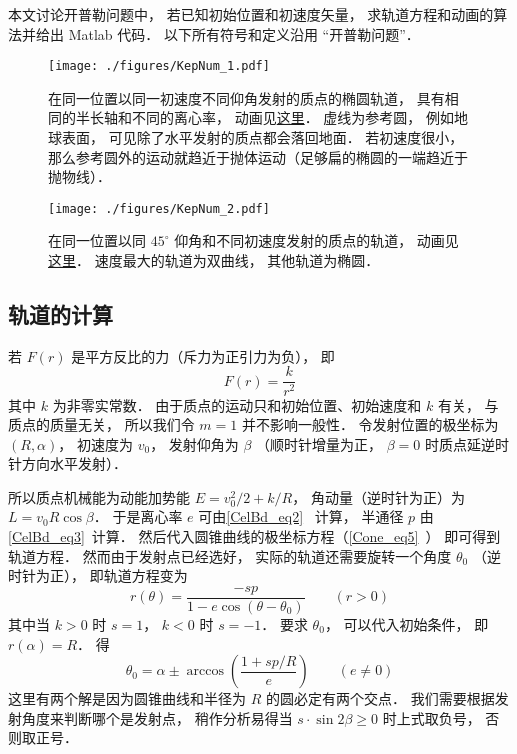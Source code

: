 
\begin{issues}
\end{issues}


本文讨论开普勒问题中， 若已知初始位置和初速度矢量， 求轨道方程和动画的算法并给出 Matlab 代码． 以下所有符号和定义沿用 “开普勒问题”．
\begin{figure}[ht]
\centering
\texttt{[image: ./figures/KepNum\_1.pdf]}
\caption{在同一位置以同一初速度不同仰角发射的质点的椭圆轨道， 具有相同的半长轴和不同的离心率， 动画见\href{https://wuli.wiki/apps/Kepler.html}{这里}． 虚线为参考圆， 例如地球表面， 可见除了水平发射的质点都会落回地面． 若初速度很小， 那么参考圆外的运动就趋近于抛体运动（足够扁的椭圆的一端趋近于抛物线）．} \label{KepNum_fig1}
\end{figure}

\begin{figure}[ht]
\centering
\texttt{[image: ./figures/KepNum\_2.pdf]}
\caption{在同一位置以同 $45^\circ$ 仰角和不同初速度发射的质点的轨道， 动画见\href{https://wuli.wiki/apps/Kepler2.html}{这里}． 速度最大的轨道为双曲线， 其他轨道为椭圆．} \label{KepNum_fig2}
\end{figure}

\subsection{轨道的计算}
若 $F(r)$ 是平方反比的力（斥力为正引力为负）， 即
\begin{equation}
F(r) = \frac{k}{r^2}
\end{equation}
其中 $k$ 为非零实常数． 由于质点的运动只和初始位置、初始速度和 $k$ 有关， 与质点的质量无关， 所以我们令 $m=1$ 并不影响一般性． 令发射位置的极坐标为 $(R,\alpha)$， 初速度为 $v_0$， 发射仰角为 $\beta$ （顺时针增量为正， $\beta=0$ 时质点延逆时针方向水平发射）．

所以质点机械能为动能加势能 $E = v_0^2/2 + k/R$， 角动量（逆时针为正）为 $L = v_0 R\cos\beta$． 于是离心率 $e$ 可由\autoref{CelBd_eq2}~ 计算， 半通径 $p$ 由\autoref{CelBd_eq3}~计算． 然后代入圆锥曲线的极坐标方程（\autoref{Cone_eq5}~） 即可得到轨道方程． 然而由于发射点已经选好， 实际的轨道还需要旋转一个角度 $\theta_0$ （逆时针为正）， 即轨道方程变为
\begin{equation}\label{KepNum_eq1}
r(\theta)  = \frac{-s p}{1 - e\cos (\theta-\theta_0)} \qquad (r > 0)
\end{equation}
其中当 $k>0$ 时 $s=1$， $k<0$ 时 $s=-1$． 要求 $\theta_0$， 可以代入初始条件， 即 $r(\alpha) = R$． 得
\begin{equation}
\theta_0 = \alpha \pm \arccos(\frac{1+ sp/R}{e}) \qquad (e\ne 0)
\end{equation}
这里有两个解是因为圆锥曲线和半径为 $R$ 的圆必定有两个交点． 我们需要根据发射角度来判断哪个是发射点， 稍作分析易得当 $s\cdot\sin2\beta \geqslant 0$ 时上式取负号， 否则取正号．

